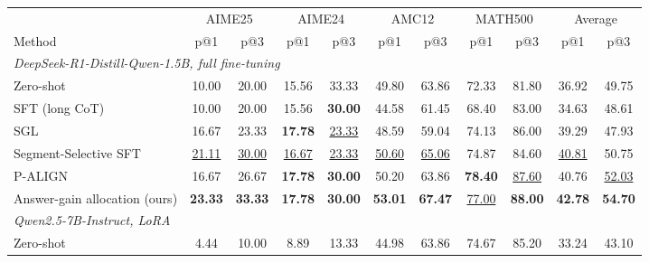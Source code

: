 \documentclass[11pt]{article}
\newcommand{\uniformpalign}{P-ALIGN}
\begin{document}
\begin{table}[t]
  \centering
  \small
  \setlength{\tabcolsep}{3.2pt}
  \begin{tabular}{lcccccccccc}
    \toprule
    & \multicolumn{2}{c}{AIME25}
    & \multicolumn{2}{c}{AIME24}
    & \multicolumn{2}{c}{AMC12}
    & \multicolumn{2}{c}{MATH500}
    & \multicolumn{2}{c}{Average} \\
    \cmidrule(lr){2-3}
    \cmidrule(lr){4-5}
    \cmidrule(lr){6-7}
    \cmidrule(lr){8-9}
    \cmidrule(lr){10-11}
    Method & p@1 & p@3 & p@1 & p@3
           & p@1 & p@3 & p@1 & p@3
           & p@1 & p@3 \\
    \midrule

    \multicolumn{11}{l}{\textit{DeepSeek-R1-Distill-Qwen-1.5B, full fine-tuning}} \\

    Zero-shot
    & 10.00 & 20.00
    & 15.56 & 33.33
    & 49.80 & 63.86
    & 72.33 & 81.80
    & 36.92 & 49.75 \\

    SFT (long CoT)
    & 10.00 & 20.00
    & 15.56 & \textbf{30.00}
    & 44.58 & 61.45
    & 68.40 & 83.00
    & 34.63 & 48.61 \\

    SGL \citep{fan2026sgl}
    & 16.67 & 23.33
    & \textbf{17.78} & \underline{23.33}
    & 48.59 & 59.04
    & 74.13 & 86.00
    & 39.29 & 47.93 \\

    Segment-Selective SFT \citep{wang2026segattr}
    & \underline{21.11} & \underline{30.00}
    & \underline{16.67} & \underline{23.33}
    & \underline{50.60} & \underline{65.06}
    & 74.87 & 84.60
    & \underline{40.81} & 50.75 \\

    \uniformpalign{}
    & 16.67 & 26.67
    & \textbf{17.78} & \textbf{30.00}
    & 50.20 & 63.86
    & \textbf{78.40} & \underline{87.60}
    & 40.76 & \underline{52.03} \\

    Answer-gain allocation (ours)
    & \textbf{23.33} & \textbf{33.33}
    & \textbf{17.78} & \textbf{30.00}
    & \textbf{53.01} & \textbf{67.47}
    & \underline{77.00} & \textbf{88.00}
    & \textbf{42.78} & \textbf{54.70} \\

    \midrule
    \multicolumn{11}{l}{\textit{Qwen2.5-7B-Instruct, LoRA}} \\

    Zero-shot
    & 4.44 & 10.00
    & 8.89 & 13.33
    & 44.98 & 63.86
    & 74.67 & 85.20
    & 33.24 & 43.10 \\


\end{tabular}
\end{table}
\end{document}
